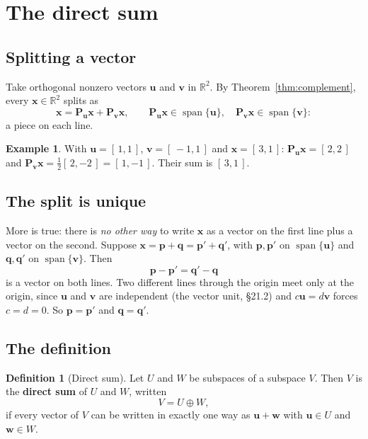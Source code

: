 \documentclass[11pt]{article}
\theoremstyle{plain}
\theoremstyle{definition}
\newtheorem{defn}{Definition}[section]
\newtheorem{ex}{Example}[section]
\theoremstyle{remark}
\newcommand{\R}{\mathbb{R}}
\newcommand{\vc}[1]{\mathbf{#1}}
\newcommand{\mt}[1]{\mathbf{#1}}
\DeclareMathOperator{\spanop}{span}
\begin{document}
\section{The direct sum}

\subsection{Splitting a vector}
Take orthogonal nonzero vectors $\vc{u}$ and $\vc{v}$ in $\R^{2}$. By
Theorem~\ref{thm:complement}, every $\vc{x}\in\R^{2}$ splits as
\[
  \vc{x}=\mt{P}_{\vc{u}}\vc{x}+\mt{P}_{\vc{v}}\vc{x},
  \qquad
  \mt{P}_{\vc{u}}\vc{x}\in\spanop\{\vc{u}\},\quad
  \mt{P}_{\vc{v}}\vc{x}\in\spanop\{\vc{v}\} :
\]
a piece on each line.

\begin{ex}
\label{ex:split}
With $\vc{u}=[\,1,1\,]$, $\vc{v}=[\,-1,1\,]$ and $\vc{x}=[\,3,1\,]$:
$\mt{P}_{\vc{u}}\vc{x}=[\,2,2\,]$ and
$\mt{P}_{\vc{v}}\vc{x}=\frac12[\,2,-2\,]=[\,1,-1\,]$. Their sum is $[\,3,1\,]$.
\end{ex}

\subsection{The split is unique}
More is true: there is \emph{no other way} to write $\vc{x}$ as a vector on the
first line plus a vector on the second. Suppose
$\vc{x}=\vc{p}+\vc{q}=\vc{p}'+\vc{q}'$, with $\vc{p},\vc{p}'$ on
$\spanop\{\vc{u}\}$ and $\vc{q},\vc{q}'$ on $\spanop\{\vc{v}\}$. Then
\[
  \vc{p}-\vc{p}'=\vc{q}'-\vc{q}
\]
is a vector on both lines. Two different lines through the origin meet only at
the origin, since $\vc{u}$ and $\vc{v}$ are independent (the vector unit,
\S21.2) and $c\vc{u}=d\vc{v}$ forces $c=d=0$. So $\vc{p}=\vc{p}'$ and
$\vc{q}=\vc{q}'$.

\subsection{The definition}
\begin{defn}[Direct sum]
Let $U$ and $W$ be subspaces of a subspace $V$. Then $V$ is the \textbf{direct
sum} of $U$ and $W$, written
\[
  V=U\oplus W,
\]
if every vector of $V$ can be written in exactly one way as $\vc{u}+\vc{w}$ with
$\vc{u}\in U$ and $\vc{w}\in W$.
\end{defn}
\end{document}
